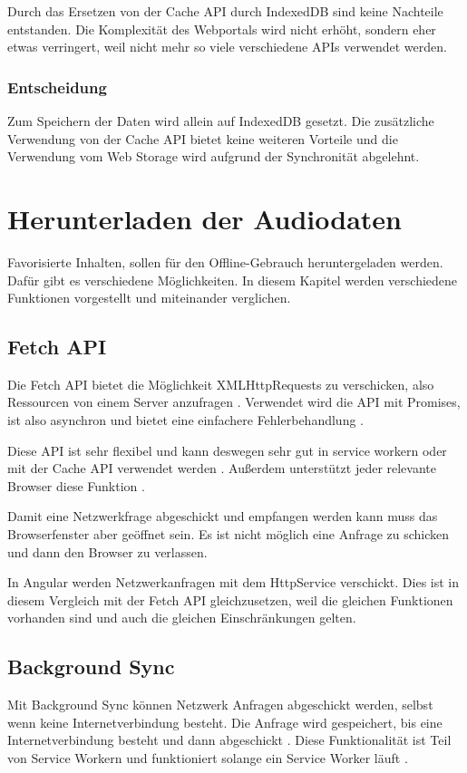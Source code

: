 Durch das Ersetzen von der Cache \ac{API} durch IndexedDB sind keine Nachteile entstanden. Die Komplexität des Webportals wird nicht erhöht, sondern eher etwas verringert, weil nicht mehr so viele verschiedene \acp{API} verwendet werden.

\subsubsection{Entscheidung}
Zum Speichern der Daten wird allein auf IndexedDB gesetzt. Die zusätzliche Verwendung von der Cache \ac{API} bietet keine weiteren Vorteile und die Verwendung vom Web Storage wird aufgrund der Synchronität abgelehnt.  

\clearpage

\section{Herunterladen der Audiodaten}
Favorisierte Inhalten, sollen für den Offline-Gebrauch heruntergeladen werden. Dafür gibt es verschiedene Möglichkeiten. In diesem Kapitel werden verschiedene Funktionen vorgestellt und miteinander verglichen. 

\subsection{Fetch API}
Die Fetch \ac{API} bietet die Möglichkeit XMLHttpRequests zu verschicken, also Ressourcen von einem Server anzufragen \autocite{Rojas2020}. Verwendet wird die \ac{API} mit Promises, ist also asynchron und bietet eine einfachere Fehlerbehandlung \autocite{Rojas2020} \autocite{mdn-fetch}. 

Diese \ac{API} ist sehr flexibel und kann deswegen sehr gut in service workern oder mit der Cache \ac{API} verwendet werden \autocite{mdn-fetch}. Außerdem unterstützt jeder relevante Browser diese Funktion \autocite{mdn-fetch}. 

Damit eine Netzwerkfrage abgeschickt und empfangen werden kann muss das Browserfenster aber geöffnet sein. Es ist nicht möglich eine Anfrage zu schicken und dann den Browser zu verlassen.

In Angular werden Netzwerkanfragen mit dem HttpService verschickt. Dies ist in diesem Vergleich mit der Fetch \ac{API} gleichzusetzen, weil die gleichen Funktionen vorhanden sind und auch die gleichen Einschränkungen gelten.

\subsection{Background Sync}
Mit Background Sync können Netzwerk Anfragen abgeschickt werden, selbst wenn keine Internetverbindung besteht. Die Anfrage wird gespeichert, bis eine Internetverbindung besteht und dann abgeschickt \autocite{wicg-background-sync}. Diese Funktionalität ist Teil von Service Workern und funktioniert solange ein Service Worker läuft \autocite{wicg-background-sync}. 

